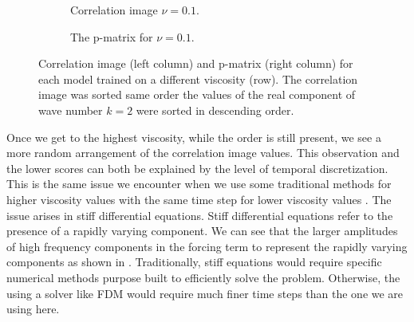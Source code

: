 \documentclass[preprint,12pt,times,authoryear]{elsarticle}
\begin{document}
\begin{figure}[hbp]
\begin{subfigure}{0.49\linewidth}
\begin{adjustbox}{height=5.5cm}
      
    \end{adjustbox}
    \caption{Correlation image \(\nu=0.1\).}\label{fig:sc2_ci_0.1}
  \end{subfigure}
  \begin{subfigure}{0.49\linewidth}
    \centering
    \begin{adjustbox}{height=5.5cm}
      
    \end{adjustbox}
    \caption{The p-matrix for \(\nu=0.1\).}\label{fig:sc2_pm_0.1}
  \end{subfigure}
  \caption{Correlation image (left column) and p-matrix (right column) for each model trained on a different viscosity (row). The correlation image was sorted same order the values of the real component of wave number \(k=2\) were sorted in descending order.}\label{fig:scenario_2_interpretation}
\end{figure}

Once we get to the highest viscosity, while the order is still present, we see a more random arrangement of the correlation image values. This observation and the lower scores can both be explained by the level of temporal discretization. This is the same issue we encounter when we use some traditional methods for higher viscosity values with the same time step for lower viscosity values \citep{kassamFourthOrderTimeSteppingStiff2005,seydaogluNumericalSolutionBurgers2016}. The issue arises in stiff differential equations. Stiff differential equations refer to the presence of a rapidly varying component. We can see that the larger amplitudes of high frequency components in the forcing term to represent the rapidly varying components as shown in . Traditionally, stiff equations would require specific numerical methods purpose built to efficiently solve the problem. Otherwise, the using a solver like FDM would require much finer time steps than the one we are using here.%
\end{document}
